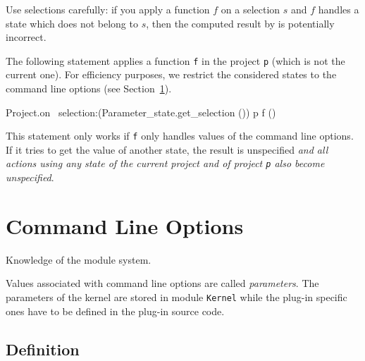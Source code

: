 \begin{important}
  Use selections carefully: if you apply a function $f$ on a selection $s$ and
  $f$ handles a state which does not belong to $s$, then the computed result by
  \framac is potentially incorrect.
\end{important}

\begin{example}
The following statement applies a function \texttt{f} in the project \texttt{p}
(which is not the current one). For efficiency purposes, we restrict the
considered states to the command line options (see Section~\ref{adv:cmdline}).
\begin{ocamlcode}
Project.on ~selection:(Parameter_state.get_selection ()) p f ()
\end{ocamlcode}
This statement only works if \texttt{f} only handles values of the command line
options. If it tries to get the value of another
state, the result is unspecified \emph{and all actions using any state of the
  current project and of project \texttt{p} also become
  unspecified}.
\end{example}


\section{Command Line Options}\label{adv:cmdline}

\begin{prereq}
  Knowledge of the \caml module system.
\end{prereq}

Values associated with command line options are called
\emph{parameters}. The parameters of the \framac kernel
are stored in module \texttt{Kernel} while the
plug-in specific ones have to be defined in the plug-in source
code.

\subsection{Definition}\label{options:definition}

